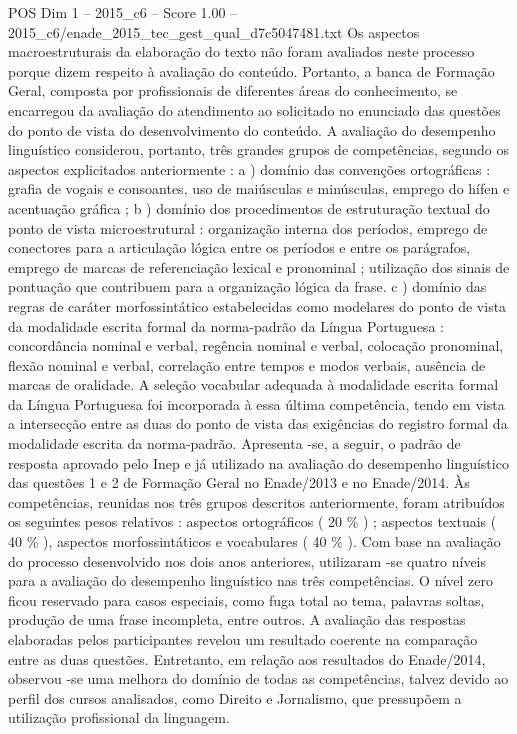 \begin{textsample}{POS Dim 1 – 2015\_c6 – Score 1.00 – 2015\_c6/enade\_2015\_tec\_gest\_qual\_d7c5047481.txt}
Os aspectos macroestruturais da elaboração do texto não foram avaliados neste processo porque dizem respeito à avaliação do conteúdo.
Portanto, a banca de Formação Geral, composta por profissionais de diferentes áreas do conhecimento, se encarregou da avaliação do atendimento ao solicitado no enunciado das questões do ponto de vista do desenvolvimento do conteúdo.
A avaliação do desempenho linguístico considerou, portanto, três grandes grupos de competências, segundo os aspectos explicitados anteriormente : a ) domínio das convenções ortográficas : grafia de vogais e consoantes, uso de maiúsculas e minúsculas, emprego do hífen e acentuação gráfica ; b ) domínio dos procedimentos de estruturação textual do ponto de vista microestrutural : organização interna dos períodos, emprego de conectores para a articulação lógica entre os períodos e entre os parágrafos, emprego de marcas de referenciação lexical e pronominal ; utilização dos sinais de pontuação que contribuem para a organização lógica da frase. c ) domínio das regras de caráter morfossintático estabelecidas como modelares do ponto de vista da modalidade escrita formal da norma-padrão da Língua Portuguesa : concordância nominal e verbal, regência nominal e verbal, colocação pronominal, flexão nominal e verbal, correlação entre tempos e modos verbais, ausência de marcas de oralidade.
A seleção vocabular adequada à modalidade escrita formal da Língua Portuguesa foi incorporada à essa última competência, tendo em vista a intersecção entre as duas do ponto de vista das exigências do registro formal da modalidade escrita da norma-padrão.
Apresenta -se, a seguir, o padrão de resposta aprovado pelo Inep e já utilizado na avaliação do desempenho linguístico das questões 1 e 2 de Formação Geral no Enade/2013 e no Enade/2014.
Às competências, reunidas nos três grupos descritos anteriormente, foram atribuídos os seguintes pesos relativos : aspectos ortográficos ( 20 \% ) ; aspectos textuais ( 40 \% ), aspectos morfossintáticos e vocabulares ( 40 \% ).
Com base na avaliação do processo desenvolvido nos dois anos anteriores, utilizaram -se quatro níveis para a avaliação do desempenho linguístico nas três competências.
O nível zero ficou reservado para casos especiais, como fuga total ao tema, palavras soltas, produção de uma frase incompleta, entre outros.
A avaliação das respostas elaboradas pelos participantes revelou um resultado coerente na comparação entre as duas questões.
Entretanto, em relação aos resultados do Enade/2014, observou -se uma melhora do domínio de todas as competências, talvez devido ao perfil dos cursos analisados, como Direito e Jornalismo, que pressupõem a utilização profissional da linguagem.

\end{textsample}

